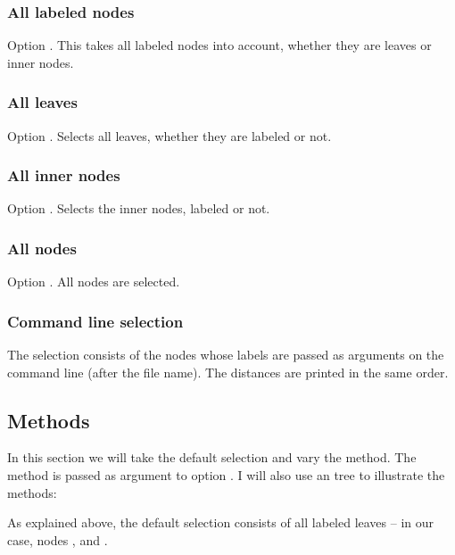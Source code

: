 \subsubsection{All labeled nodes}

Option . This takes all labeled nodes into account, whether they are leaves or inner nodes.

\subsubsection{All leaves}

Option . Selects all leaves, whether they are
labeled or not.

\subsubsection{All inner nodes}

Option . Selects the inner nodes, labeled or not.

\subsubsection{All nodes}

Option . All nodes are selected.

\subsubsection{Command line selection}

The selection consists of the nodes whose labels are passed as arguments on the
command line (after the file name). The distances are printed in the same
order.


\subsection{Methods}

In this section we will take the default selection and vary the method. The
method is passed as argument to option . I will also use an
\adhoc{} tree to illustrate the methods:


\noindent{}As explained above, the default selection consists of all labeled
leaves -- in our case, nodes ,  and . 

